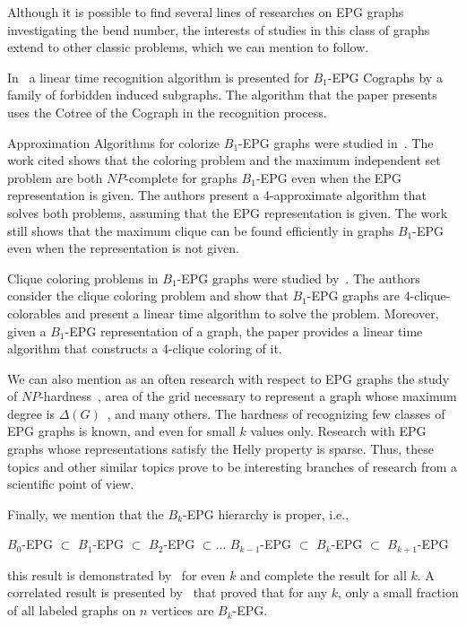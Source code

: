 Although it is possible to find several lines of researches on EPG graphs investigating the bend number, the interests of studies in this class of graphs extend to other classic problems, which we can mention to follow.


In~\citet{cohen2014} a linear time recognition algorithm is presented for $ B_{1}$-EPG Cographs by a family of forbidden induced subgraphs. The algorithm that the paper presents uses the Cotree of the Cograph in the recognition process.

Approximation Algorithms for colorize $ B_1$-EPG graphs  were studied in~\cite{epstein2013approximation}. The work cited shows that the coloring problem and the maximum independent set problem are both $ NP$-complete for graphs $ B_1$-EPG even when the EPG representation is given. The authors present a 4-approximate algorithm that solves both problems, assuming that the EPG representation is given. The work still shows that the maximum clique can be found efficiently in graphs $ B_1$-EPG even when the representation is not given.

Clique coloring problems in $B_1$-EPG graphs were studied by~\cite{bonomo2017clique}. The authors consider the clique coloring problem and show that $B_1$-EPG graphs are 4-clique-colorables and present a linear time algorithm to solve the problem. Moreover, given a $B_1$-EPG representation of a graph, the paper provides a linear time algorithm that constructs a 4-clique coloring of it.
 
We can also mention as an often research with respect to EPG graphs the study of $NP$-hardness~\cite{daniel2014b, martin2017}, area of the grid necessary to represent a graph whose maximum degree is $\Delta(G)$~\cite{Asinowski2009}, and many others. The hardness of recognizing few classes of EPG graphs is known, and even for small $ k $ values only. Research with EPG graphs whose representations satisfy the Helly property is sparse. Thus, these topics and other similar topics prove to be interesting branches of research from a scientific point of view.

Finally, we mention that the $B_k$-EPG hierarchy is proper, i.e.,

$B_0$-EPG $\subset$ $B_1$-EPG $\subset$ $B_2$-EPG $\subset \dots$ $B_{k-1}$-EPG $\subset$ $B_k$-EPG $\subset$ $B_{k+1}$-EPG 

this result is demonstrated by~\citet{biedl2010} for even $k$ and  \citet{heldt2014} complete the result for all $k$.
A correlated result is presented by~\citet{Asinowski2009} that proved that for any $k$, only a small fraction of all labeled graphs on $n$ vertices are $B_k$-EPG.

